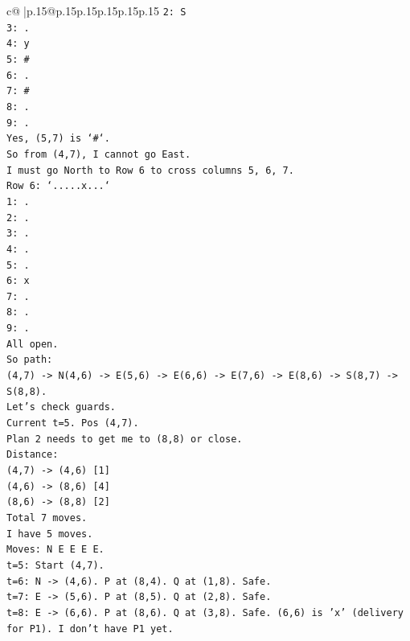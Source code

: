 \documentclass{article}
\begin{document}
{\begin{supertabular}{c@{$\;$}|p{.15\linewidth}@{}p{.15\linewidth}p{.15\linewidth}p{.15\linewidth}p{.15\linewidth}p{.15\linewidth}}
{{{\texttt{2: S} \\
\texttt{3: .} \\
\texttt{4: y} \\
\texttt{5: \#} \\
\texttt{6: .} \\
\texttt{7: \#} \\
\texttt{8: .} \\
\texttt{9: .} \\
\texttt{Yes, (5,7) is `\#`.} \\
\texttt{So from (4,7), I cannot go East.} \\
\texttt{I must go North to Row 6 to cross columns 5, 6, 7.} \\
\texttt{Row 6: `.....x...`} \\
\texttt{1: .} \\
\texttt{2: .} \\
\texttt{3: .} \\
\texttt{4: .} \\
\texttt{5: .} \\
\texttt{6: x} \\
\texttt{7: .} \\
\texttt{8: .} \\
\texttt{9: .} \\
\texttt{All open.} \\
\texttt{So path:} \\
\texttt{(4,7) {-}> N(4,6) {-}> E(5,6) {-}> E(6,6) {-}> E(7,6) {-}> E(8,6) {-}> S(8,7) {-}> S(8,8).} \\
\texttt{Let's check guards.} \\
\texttt{Current t=5. Pos (4,7).} \\
\texttt{Plan 2 needs to get me to (8,8) or close.} \\
\texttt{Distance:} \\
\texttt{(4,7) {-}> (4,6) {[}1{]}} \\
\texttt{(4,6) {-}> (8,6) {[}4{]}} \\
\texttt{(8,6) {-}> (8,8) {[}2{]}} \\
\texttt{Total 7 moves.} \\
\texttt{I have 5 moves.} \\
\texttt{Moves: N E E E E.} \\
\texttt{t=5: Start (4,7).} \\
\texttt{t=6: N {-}> (4,6). P at (8,4). Q at (1,8). Safe.} \\
\texttt{t=7: E {-}> (5,6). P at (8,5). Q at (2,8). Safe.} \\
\texttt{t=8: E {-}> (6,6). P at (8,6). Q at (3,8). Safe. (6,6) is 'x' (delivery for P1). I don't have P1 yet.} \\
}}}
\end{supertabular}}
\end{document}
